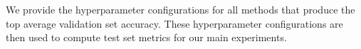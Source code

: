 We provide the hyperparameter configurations for all methods that produce the top average validation set accuracy.
These hyperparameter configurations are then used to compute test set metrics for our main experiments.



